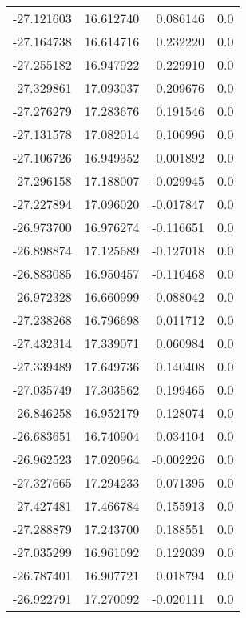 \begin{tabular}{rrrr}
      -27.121603 &        16.612740 &    0.086146 &   0.0 \\
      -27.164738 &        16.614716 &    0.232220 &   0.0 \\
      -27.255182 &        16.947922 &    0.229910 &   0.0 \\
      -27.329861 &        17.093037 &    0.209676 &   0.0 \\
      -27.276279 &        17.283676 &    0.191546 &   0.0 \\
      -27.131578 &        17.082014 &    0.106996 &   0.0 \\
      -27.106726 &        16.949352 &    0.001892 &   0.0 \\
      -27.296158 &        17.188007 &   -0.029945 &   0.0 \\
      -27.227894 &        17.096020 &   -0.017847 &   0.0 \\
      -26.973700 &        16.976274 &   -0.116651 &   0.0 \\
      -26.898874 &        17.125689 &   -0.127018 &   0.0 \\
      -26.883085 &        16.950457 &   -0.110468 &   0.0 \\
      -26.972328 &        16.660999 &   -0.088042 &   0.0 \\
      -27.238268 &        16.796698 &    0.011712 &   0.0 \\
      -27.432314 &        17.339071 &    0.060984 &   0.0 \\
      -27.339489 &        17.649736 &    0.140408 &   0.0 \\
      -27.035749 &        17.303562 &    0.199465 &   0.0 \\
      -26.846258 &        16.952179 &    0.128074 &   0.0 \\
      -26.683651 &        16.740904 &    0.034104 &   0.0 \\
      -26.962523 &        17.020964 &   -0.002226 &   0.0 \\
      -27.327665 &        17.294233 &    0.071395 &   0.0 \\
      -27.427481 &        17.466784 &    0.155913 &   0.0 \\
      -27.288879 &        17.243700 &    0.188551 &   0.0 \\
      -27.035299 &        16.961092 &    0.122039 &   0.0 \\
      -26.787401 &        16.907721 &    0.018794 &   0.0 \\
      -26.922791 &        17.270092 &   -0.020111 &   0.0 \\

\end{tabular}

